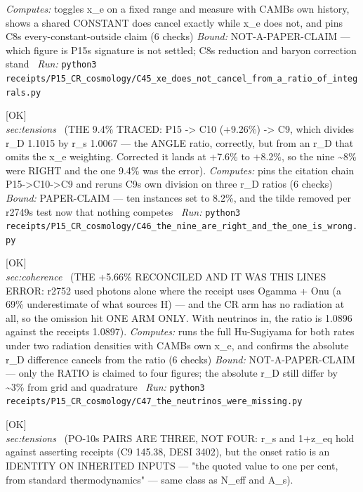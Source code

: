 \begin{description}
\emph{Computes:} toggles x\_e on a fixed range and measure with CAMBs own history, shows a shared CONSTANT does cancel exactly while x\_e does not, and pins C8s every-constant-outside claim (6 checks)
 \emph{Bound:} NOT-A-PAPER-CLAIM --- which figure is P15s signature is not settled; C8s reduction and baryon correction stand
\ \emph{Run:} \texttt{python3 receipts/P15\_CR\_cosmology/C45\_xe\_does\_not\_cancel\_from\_a\_ratio\_of\_integrals.py}
\item[\label{rcpt:C46_the_nine_are_right_and_the_one_is_wrong}\texttt{C46\_the\_nine\_are\_right\_and\_the\_one\_is\_wrong}]\hfill\textsf{[OK]}\\
\textit{sec:tensions} \ (THE 9.4\% TRACED: P15 -> C10 (+9.26\%) -> C9, which divides r\_D 1.1015 by r\_s 1.0067 --- the ANGLE ratio, correctly, but from an r\_D that omits the x\_e weighting. Corrected it lands at +7.6\% to +8.2\%, so the nine \textasciitilde{}8\% were RIGHT and the one 9.4\% was the error). 
\emph{Computes:} pins the citation chain P15->C10->C9 and reruns C9s own division on three r\_D ratios (6 checks)
 \emph{Bound:} PAPER-CLAIM --- ten instances set to 8.2\%, and the tilde removed per r2749s test now that nothing competes
\ \emph{Run:} \texttt{python3 receipts/P15\_CR\_cosmology/C46\_the\_nine\_are\_right\_and\_the\_one\_is\_wrong.py}
\item[\label{rcpt:C47_the_neutrinos_were_missing}\texttt{C47\_the\_neutrinos\_were\_missing}]\hfill\textsf{[OK]}\\
\textit{sec:coherence} \ (THE +5.66\% RECONCILED AND IT WAS THIS LINES ERROR: r2752 used photons alone where the receipt uses Ogamma + Onu (a 69\% underestimate of what sources H) --- and the CR arm has no radiation at all, so the omission hit ONE ARM ONLY. With neutrinos in, the ratio is 1.0896 against the receipts 1.0897). 
\emph{Computes:} runs the full Hu-Sugiyama for both rates under two radiation densities with CAMBs own x\_e, and confirms the absolute r\_D difference cancels from the ratio (6 checks)
 \emph{Bound:} NOT-A-PAPER-CLAIM --- only the RATIO is claimed to four figures; the absolute r\_D still differ by \textasciitilde{}3\% from grid and quadrature
\ \emph{Run:} \texttt{python3 receipts/P15\_CR\_cosmology/C47\_the\_neutrinos\_were\_missing.py}
\item[\label{rcpt:C48_the_pairs_are_three}\texttt{C48\_the\_pairs\_are\_three}]\hfill\textsf{[OK]}\\
\textit{sec:tensions} \ (PO-10s PAIRS ARE THREE, NOT FOUR: r\_s and 1+z\_eq hold against asserting receipts (C9 145.38, DESI 3402), but the onset ratio is an IDENTITY ON INHERITED INPUTS --- "the quoted value to one per cent, from standard thermodynamics" --- same class as N\_eff and A\_s). 

\end{description}
